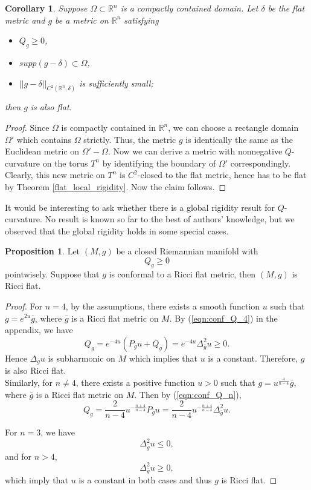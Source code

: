 \documentclass[12pt]{amsart}
\newtheorem{corollary}[theorem]{Corollary}
\theoremstyle{definition}
\newtheorem{proposition}[theorem]{Proposition}
\theoremstyle{remark}
\numberwithin{equation}{section}
\begin{document}
\begin{corollary}\label{flat_domain_rigidity}
Suppose $\Omega \subset \mathbb{R}^n$ is a compactly contained domain. Let $\delta$ be the flat metric and $g$ be a metric on $\mathbb{R}^n$ satisfying
\begin{itemize}
\item $Q_g \geq 0$,
\item $supp(g - \delta) \subset \Omega$,
\item $||g - \delta||_{C^2(\mathbb{R}^n, \delta)}$ is sufficiently small;
\end{itemize}
then $g$ is also flat.
\end{corollary}

\begin{proof}

Since $\Omega$ is compactly contained in $\mathbb{R}^n$, we can choose a rectangle domain $\Omega'$ which contains $\Omega$ strictly. Thus, the metric $g$ is identically the same as the Euclidean metric on $\Omega' - \Omega$. Now we can derive a metric with nonnegative $Q$-curvature on the torus $T^n$ by identifying the boundary of $\Omega'$ correspondingly. Clearly, this new metric on $T^n$ is $C^2$-closed to the flat metric, hence has to be flat by Theorem \ref{flat_local_rigidity}. Now the claim follows.
 
\end{proof}

It would be interesting to ask whether there is a global rigidity result for $Q$-curvature. No result is known so far to the best of authors' knowledge, but we observed that the global rigidity holds in some special cases.

\begin{proposition}\label{prop:conf_Ricci_flat}
Let $(M, g)$ be a closed Riemannian manifold with $$Q_g \geq 0$$ pointwisely. Suppose that $g$ is conformal to a Ricci flat metric, then $(M, g)$ is Ricci flat.
\end{proposition}

\begin{proof}
For $n = 4$, by the assumptions, there exists a smooth function $u$ such that $g = e^{2u} \bar g$, where $\bar g$ is a Ricci flat metric on $M$. By (\ref{eqn:conf_Q_4}) in the appendix, we have 
$$Q_g = e^{-4u} ( P_{\bar g} u + Q_{\bar g} )= e^{-4u} \Delta_{\bar g}^2 u \geq 0.$$ Hence $ \Delta_{\bar g}u$ is subharmonic on $M$ which implies that $u$ is a constant. Therefore, $g$ is also Ricci flat. \\

Similarly, for $n \neq 4$, there exists a positive function $u > 0$ such that $g = u^{\frac{4}{n-4}}\bar{g}$, where $\bar g$ is a Ricci flat metric on $M$. Then by (\ref{eqn:conf_Q_n}), $$Q_g = \frac{2}{n-4}u^{-\frac{n+4}{n-4}} P_{\bar{g}} u =   \frac{2}{n-4} u^{-\frac{n+4}{n-4}} \Delta_{\bar{g}}^2 u. $$

For $n=3$, we have $$\Delta_{\bar{g}}^2 u \leq 0,$$ and for $n>4$, 
$$\Delta_{\bar{g}}^2 u \geq 0,$$ which imply that $u$ is a constant in both cases and thus $g$ is Ricci flat.

\end{proof}
\end{document}

